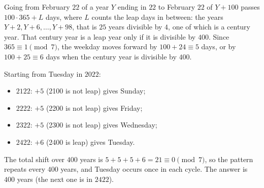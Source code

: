 Going from February $22$ of a year $Y$ ending in $22$ to February $22$ of $Y+100$ passes $100\cdot365+L$ days, where $L$ counts the leap days in between: the years $Y+2,Y+6,\dots,Y+98$, that is $25$ years divisible by $4$, one of which is a century year. That century year is a leap year only if it is divisible by $400$. Since $365\equiv1\pmod7$, the weekday moves forward by $100+24\equiv5$ days, or by $100+25\equiv6$ days when the century year is divisible by $400$.

Starting from Tuesday in $2022$:
\begin{itemize}
\item $2122$: $+5$ (2100 is not leap) gives Sunday;
\item $2222$: $+5$ (2200 is not leap) gives Friday;
\item $2322$: $+5$ (2300 is not leap) gives Wednesday;
\item $2422$: $+6$ (2400 is leap) gives Tuesday.
\end{itemize}
The total shift over $400$ years is $5+5+5+6=21\equiv0\pmod7$, so the pattern repeats every $400$ years, and Tuesday occurs once in each cycle. The answer is $\boxed{400}$ years (the next one is in $2422$).
